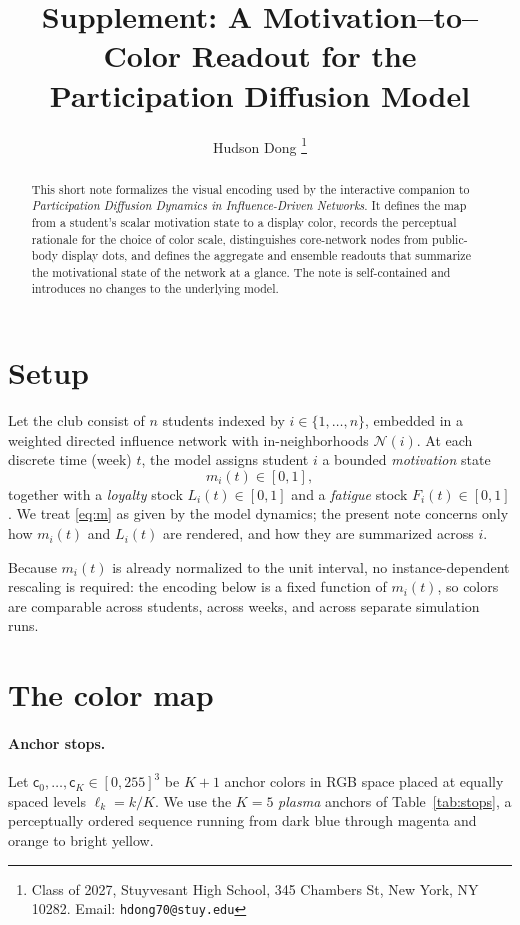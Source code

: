 \documentclass[11pt]{article}
\title{\textbf{Supplement: A Motivation--to--Color Readout for the\\
Participation Diffusion Model}}
\author{Hudson Dong \thanks{Class of 2027, Stuyvesant High School, 345 Chambers St, New York, NY 10282. Email: \texttt{hdong70@stuy.edu}}}
\date{}
\newcommand{\Nn}{\mathcal{N}}
\begin{document}
\maketitle
\vspace{-3em}

\begin{abstract}
\noindent
This short note formalizes the visual encoding used by the interactive companion to
\emph{Participation Diffusion Dynamics in Influence-Driven Networks}. It defines the map from a
student's scalar motivation state to a display color, records the perceptual rationale for the
choice of color scale, distinguishes core-network nodes from public-body display dots, and defines
the aggregate and ensemble readouts that summarize the motivational state of the network at a
glance. The note is self-contained and introduces no changes to the underlying model.
\end{abstract}

\section{Setup}

Let the club consist of $n$ students indexed by $i \in \{1,\dots,n\}$, embedded in a weighted
directed influence network with in-neighborhoods $\Nn(i)$. At each discrete time (week) $t$, the
model assigns student $i$ a bounded \emph{motivation} state
\begin{equation}
  m_i(t) \in [0,1],
  \label{eq:m}
\end{equation}
together with a \emph{loyalty} stock $L_i(t)\in[0,1]$ and a \emph{fatigue} stock $F_i(t)\in[0,1]$.
We treat \eqref{eq:m} as given by the model dynamics; the present note concerns only how
$m_i(t)$ and $L_i(t)$ are rendered, and how they are summarized across $i$.

Because $m_i(t)$ is already normalized to the unit interval, no instance-dependent rescaling is
required: the encoding below is a fixed function of $m_i(t)$, so colors are comparable across
students, across weeks, and across separate simulation runs.

\section{The color map}

\paragraph{Anchor stops.}
Let $\mathsf{c}_0,\dots,\mathsf{c}_K \in [0,255]^3$ be $K{+}1$ anchor colors in RGB space placed at
equally spaced levels $\ell_k = k/K$. We use the $K{=}5$ \emph{plasma} anchors of
Table~\ref{tab:stops}, a perceptually ordered sequence running from dark blue through magenta and
orange to bright yellow.
\end{document}
